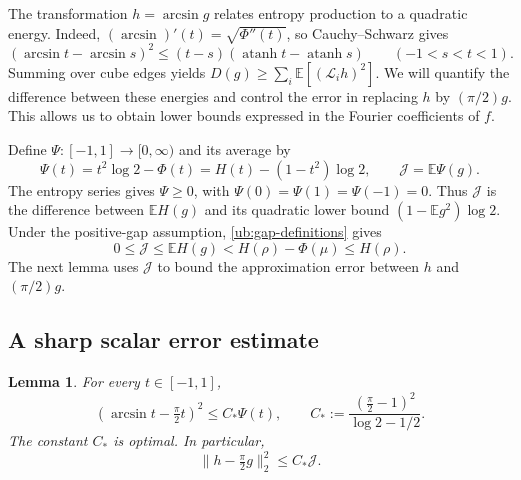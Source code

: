 \documentclass[11pt,letterpaper]{amsart}
\newcommand{\E}{\mathbb E}
\newcommand{\1}{\mathbf 1}
\DeclareMathOperator{\atanh}{atanh}
\newtheorem{lemma}[theorem]{Lemma}
\numberwithin{equation}{section}
\begin{document}
The transformation $h=\arcsin g$ relates entropy production
to a quadratic energy.
Indeed, $(\arcsin)'(t)=\sqrt{\Phi''(t)}$, so
Cauchy--Schwarz gives
\[
 (\arcsin t-\arcsin s)^2
 \le(t-s)(\atanh t-\atanh s)
 \qquad(-1<s<t<1).
\]
Summing over cube edges yields
$D(g)\ge\sum_i\E[(\mathcal L_i h)^2]$.
We will quantify the difference between these energies and
control the error in replacing $h$ by $(\pi/2)g$.
This allows us to obtain lower bounds expressed in the
Fourier coefficients of $f$.

Define $\Psi:[-1,1]\to[0,\infty)$ and its average by
\begin{equation}\label{eq:entropy-correction}
 \Psi(t)=t^2\log2-\Phi(t)
        =H(t)-(1-t^2)\log2,
 \qquad
 \mathcal J=\E\Psi(g).
\end{equation}
The entropy series gives $\Psi\ge0$, with
$\Psi(0)=\Psi(1)=\Psi(-1)=0$.
Thus $\mathcal J$ is the difference between $\E H(g)$
and its quadratic lower bound $(1-\E g^2)\log2$.
Under the positive-gap assumption,
\eqref{ub:gap-definitions} gives
\[
 0\le\mathcal J\le\E H(g)
 <H(\rho)-\Phi(\mu)\le H(\rho).
\]
The next lemma uses $\mathcal J$ to bound the approximation
error between $h$ and $(\pi/2)g$.

\subsection{A sharp scalar error estimate}

\begin{lemma}\label{fh:arcsine-error}
For every $t\in[-1,1]$,
\begin{equation}\label{eq:arcsine-constant}
 (\arcsin t-\tfrac{\pi}{2}t)^2\le C_*\Psi(t),
 \qquad
 C_*:=\frac{(\frac{\pi}{2}-1)^2}{\log2-1/2}.
\end{equation}
The constant $C_*$ is optimal.
In particular,
\[
 \|h-\tfrac{\pi}{2}g\|_2^2\le C_*\mathcal J.
\]
\end{lemma}
\end{document}
